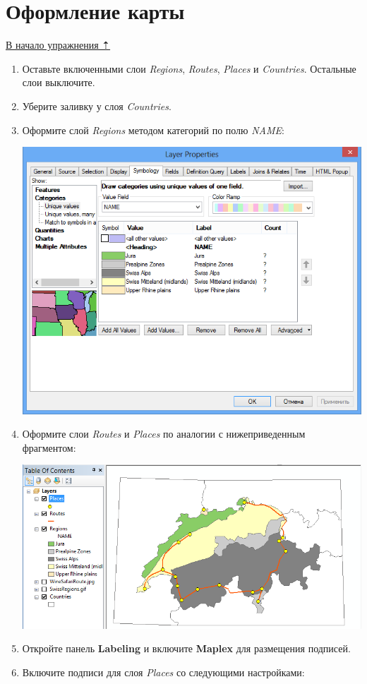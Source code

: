 \documentclass[]{book}
\theoremstyle{definition}
\theoremstyle{definition}
\theoremstyle{definition}
\theoremstyle{remark}
\begin{document}
\hypertarget{map-ref-general-design}{%
\section{Оформление карты}\label{map-ref-general-design}}

\protect\hyperlink{map-ref-general}{В начало упражнения ⇡}

\begin{enumerate}
\def\labelenumi{\arabic{enumi}.}
\item
  Оставьте включенными слои \emph{Regions}, \emph{Routes}, \emph{Places}
  и \emph{Countries}. Остальные слои выключите.
\item
  Уберите заливку у слоя \emph{Countries}.
\item
  Оформите слой \emph{Regions} методом категорий по полю \emph{NAME}:

  \includegraphics{images/Ex07/image30.png}
\item
  Оформите слои \emph{Routes} и \emph{Places} по аналогии с
  нижеприведенным фрагментом:

  \includegraphics{images/Ex07/image31.png}
\item
  Откройте панель \textbf{Labeling} и включите \textbf{Maplex} для
  размещения подписей.
\item
  Включите подписи для слоя \emph{Places} со следующими настройками:


\end{enumerate}
\end{document}
